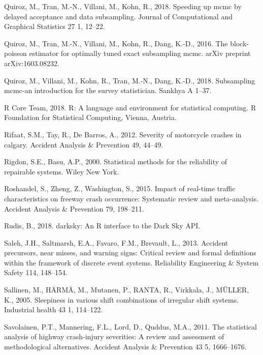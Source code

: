 \documentclass[12pt]{book}
\numberwithin{equation}{chapter}
\begin{document}
\leavevmode\hypertarget{ref-quiroz2018speeding}{}%
Quiroz, M., Tran, M.-N., Villani, M., Kohn, R., 2018. Speeding up mcmc by delayed acceptance and data subsampling. Journal of Computational and Graphical Statistics 27 1, 12--22.

\leavevmode\hypertarget{ref-quiroz2016block}{}%
Quiroz, M., Tran, M.-N., Villani, M., Kohn, R., Dang, K.-D., 2016. The block-poisson estimator for optimally tuned exact subsampling mcmc. arXiv preprint arXiv:1603.08232.

\leavevmode\hypertarget{ref-quiroz2018subsampling}{}%
Quiroz, M., Villani, M., Kohn, R., Tran, M.-N., Dang, K.-D., 2018. Subsampling mcmc-an introduction for the survey statistician. Sankhya A 1--37.

\leavevmode\hypertarget{ref-Rcitation}{}%
R Core Team, 2018. R: A language and environment for statistical computing. R Foundation for Statistical Computing, Vienna, Austria.

\leavevmode\hypertarget{ref-rifaat2012severity}{}%
Rifaat, S.M., Tay, R., De Barros, A., 2012. Severity of motorcycle crashes in calgary. Accident Analysis \& Prevention 49, 44--49.

\leavevmode\hypertarget{ref-rigdon2000statistical}{}%
Rigdon, S.E., Basu, A.P., 2000. Statistical methods for the reliability of repairable systems. Wiley New York.

\leavevmode\hypertarget{ref-roshandel2015impact}{}%
Roshandel, S., Zheng, Z., Washington, S., 2015. Impact of real-time traffic characteristics on freeway crash occurrence: Systematic review and meta-analysis. Accident Analysis \& Prevention 79, 198--211.

\leavevmode\hypertarget{ref-hrbrmstr}{}%
Rudis, B., 2018. darksky: An R interface to the Dark Sky API.

\leavevmode\hypertarget{ref-saleh2013accident}{}%
Saleh, J.H., Saltmarsh, E.A., Favaro, F.M., Brevault, L., 2013. Accident precursors, near misses, and warning signs: Critical review and formal definitions within the framework of discrete event systems. Reliability Engineering \& System Safety 114, 148--154.

\leavevmode\hypertarget{ref-sallinen2005sleepiness}{}%
Sallinen, M., HÄRMÄ, M., Mutanen, P., RANTA, R., Virkkala, J., MÜLLER, K., 2005. Sleepiness in various shift combinations of irregular shift systems. Industrial health 43 1, 114--122.

\leavevmode\hypertarget{ref-savolainen2011statistical}{}%
Savolainen, P.T., Mannering, F.L., Lord, D., Quddus, M.A., 2011. The statistical analysis of highway crash-injury severities: A review and assessment of methodological alternatives. Accident Analysis \& Prevention 43 5, 1666--1676.
\end{document}
